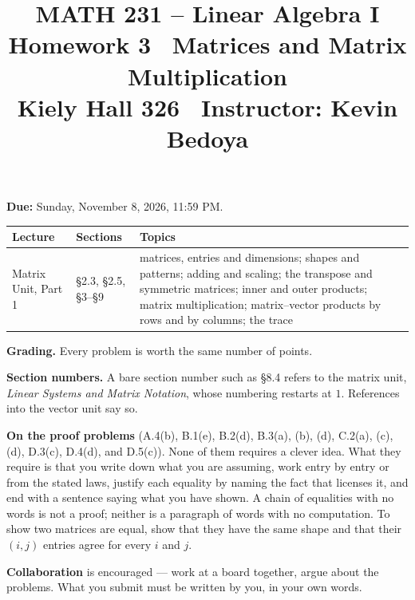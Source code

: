 \documentclass[11pt]{article}
\title{\vspace{-1.2cm}\textbf{\sffamily MATH 231 -- Linear Algebra I}\\[4pt]
       {\large\sffamily Homework 3 \textbullet\ Matrices and Matrix
        Multiplication}\\[2pt]
       {\normalsize\sffamily Kiely Hall 326 \textbullet\
        Instructor: Kevin Bedoya}}
\author{}
\date{}
\newcounter{prob}[section]
\newcommand{\duedate}{Sunday, November 8, 2026, 11:59 PM}
\begin{document}
\maketitle
\vspace{-1.6cm}

\noindent\textbf{Due:} \duedate.

\medskip
\begin{center}
\renewcommand{\arraystretch}{1.25}
\begin{tabular}{@{}l l >{\raggedright\arraybackslash}p{7.2cm}@{}}
\toprule
\textbf{Lecture} & \textbf{Sections} & \textbf{Topics} \\
\midrule
Matrix Unit, Part 1 & \S2.3, \S2.5, \S3--\S9 &
  matrices, entries and dimensions; shapes and patterns; adding and scaling;
  the transpose and symmetric matrices; inner and outer products; matrix
  multiplication; matrix--vector products by rows and by columns; the
  trace \\
\bottomrule
\end{tabular}
\end{center}

\noindent\textbf{Grading.} Every problem is worth the same number of points.

\medskip
\noindent\textbf{Section numbers.} A bare section number such as \S8.4 refers
to the matrix unit, \emph{Linear Systems and Matrix Notation}, whose numbering
restarts at $1$. References into the vector unit say so.

\medskip
\noindent\textbf{On the proof problems} (A.4(b), B.1(e), B.2(d), B.3(a), (b),
(d), C.2(a), (c), (d), D.3(c), D.4(d), and D.5(c)). None of them requires a
clever idea. What they require is that you write down what you are assuming, work
entry by entry or from the stated laws, justify each equality by naming the
fact that licenses it, and end with a sentence saying what you have shown. A
chain of equalities with no words is not a proof; neither is a paragraph of
words with no computation. To show two matrices are equal, show that they have
the same shape and that their $(i,j)$ entries agree for every $i$ and $j$.

\medskip
\noindent\textbf{Collaboration} is encouraged --- work at a board together, argue
about the problems. What you submit must be written by you, in your own words.
\end{document}

